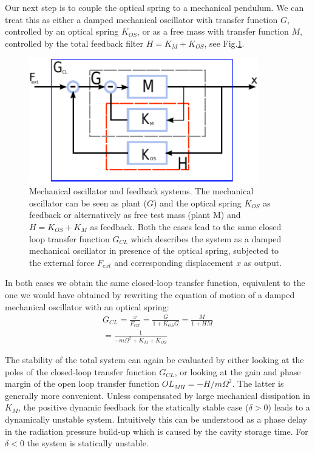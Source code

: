 Our next step is to couple the optical spring to a mechanical pendulum. We can treat this as either a damped mechanical oscillator with transfer function $G$, controlled by an optical spring $K_{OS}$, or as a free mass with transfer function $M$, controlled by the total feedback filter $H = K_M + K_{OS}$, see Fig.\ref{fig:blocks2}.
\begin{figure}[htbp]
	\centering
		\includegraphics[width=10cm]{./figures/blocks_paper.pdf}
	\caption[Mechanical Oscillator and Feedback]{{
            Mechanical oscillator and feedback systems.
            The mechanical oscillator can be seen as plant ($G$) and the optical
            spring $K_{OS}$ as feedback or alternatively as free test mass
            (plant M) and $H=K_{OS}+K_M$ as feedback. 
	    Both the cases lead to the same closed loop transfer function
            $G_{CL}$ which describes the system as a damped mechanical
            oscillator in presence of the optical spring, subjected to the
            external force $F_{ext}$ and corresponding displacement $x$ as output.}}
	\label{fig:blocks2}
\end{figure}
In both cases we obtain the same closed-loop transfer function, equivalent to the one we would have obtained by
rewriting the equation of motion of a damped mechanical oscillator with an optical spring:
\begin{eqnarray}
\label{eqn:TFco}
G_{CL}=\frac{x}{F_{ext}}=\frac{G}{1+K_{OS} G}=\frac{M}{1+H M}\nonumber\\
=\frac{1}{-m\Omega^2+K_M+K_{OS}}%
\end{eqnarray}

The stability of the total system can again be evaluated  by either looking at the poles of the closed-loop
transfer function $G_{CL}$, or looking at the gain and phase margin of the open loop transfer function $OL_{MH}=-H/m\Omega^2$. The latter is generally more convenient. Unless compensated by large mechanical dissipation in $K_M$, the positive dynamic feedback for the statically stable case ($\delta>0$) leads to a dynamically unstable system. 
Intuitively this can be understood as a phase delay in the radiation pressure build-up which is caused by the cavity storage time.
For $\delta<0$ the system is statically unstable.

